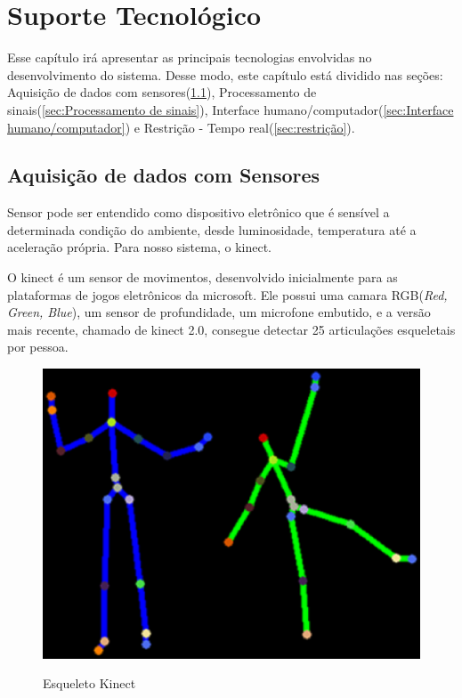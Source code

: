 
\chapter[Suporte Tecnológico]{Suporte Tecnológico}\label{ch:suporteTecnologico}
  Esse capítulo irá apresentar as principais tecnologias envolvidas no desenvolvimento do sistema.
  Desse modo, este  capítulo está dividido nas seções: Aquisição de dados com sensores(\ref{sec:Aquisição de dados com sensores}),
Processamento de sinais(\ref{sec:Processamento de sinais}), Interface humano/computador(\ref{sec:Interface humano/computador}) e
Restrição - Tempo real(\ref{sec:restrição}).

\section{Aquisição de dados com Sensores}
\label{sec:Aquisição de dados com sensores}

  Sensor pode ser entendido como dispositivo eletrônico que é sensível a determinada
condição do ambiente, desde luminosidade, temperatura até a aceleração própria.
Para nosso sistema,  o kinect.

  O kinect é um sensor de movimentos, desenvolvido inicialmente para as plataformas
de jogos eletrônicos da microsoft. Ele possui uma camara RGB(\textit{Red, Green, Blue}),
um sensor de profundidade, um microfone embutido, e a versão mais recente, chamado de kinect 2.0,
consegue detectar 25 articulações esqueletais por pessoa.

\begin{figure}[!h]
\centering
\includegraphics [keepaspectratio=true,scale=0.60]{figuras/esqueletoKinect.eps}
\caption{Esqueleto Kinect}
\cite{microsoftResearch}
\label{esqueletokinect}
\end{figure}

